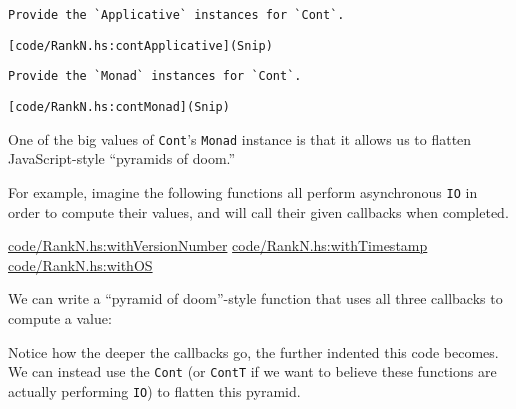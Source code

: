 \documentclass[
  11pt,
]{book}
\newenvironment{Shaded}{}{}
\newcommand{\DataTypeTok}[1]{\textcolor[rgb]{0.56,0.13,0.00}{#1}}
\newcommand{\FunctionTok}[1]{\textcolor[rgb]{0.02,0.16,0.49}{#1}}
\newcommand{\NormalTok}[1]{#1}
\newcommand{\OperatorTok}[1]{\textcolor[rgb]{0.40,0.40,0.40}{#1}}
\newcommand{\OtherTok}[1]{\textcolor[rgb]{0.00,0.44,0.13}{#1}}
\newcommand{\StringTok}[1]{\textcolor[rgb]{0.25,0.44,0.63}{#1}}
\theoremstyle{nonumberplain}
\begin{document}
\begin{verbatim}
Provide the `Applicative` instances for `Cont`.
\end{verbatim}

\begin{verbatim}
[code/RankN.hs:contApplicative](Snip)
\end{verbatim}

\begin{verbatim}
Provide the `Monad` instances for `Cont`.
\end{verbatim}

\begin{verbatim}
[code/RankN.hs:contMonad](Snip)
\end{verbatim}

One of the big values of \texttt{Cont}'s \texttt{Monad} instance is that
it allows us to flatten JavaScript-style ``pyramids of doom.''

For example, imagine the following functions all perform asynchronous
\texttt{IO} in order to compute their values, and will call their given
callbacks when completed.

\href{Snip}{code/RankN.hs:withVersionNumber}
\href{Snip}{code/RankN.hs:withTimestamp}
\href{Snip}{code/RankN.hs:withOS}

We can write a ``pyramid of doom''-style function that uses all three
callbacks to compute a value:

\begin{Shaded}
\end{Shaded}

Notice how the deeper the callbacks go, the further indented this code
becomes. We can instead use the \texttt{Cont} (or \texttt{ContT} if we
want to believe these functions are actually performing \texttt{IO}) to
flatten this pyramid.
\end{document}
